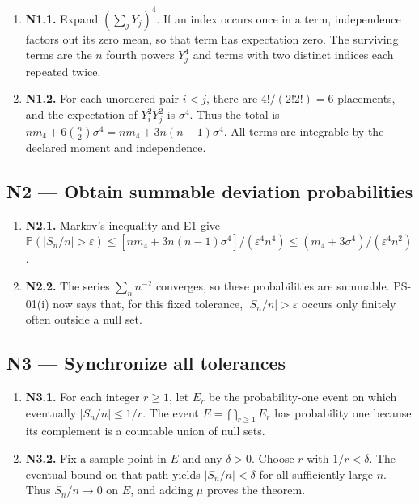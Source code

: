 \documentclass[preprint,12pt,aps,pra,showkeys,amsmath,amssymb,superscriptaddress,floatfix]{revtex4-2}
\theoremstyle{definition}
\theoremstyle{remark}
\begin{document}
\begin{enumerate}
\def\labelenumi{\arabic{enumi}.}
\item
  \textbf{N1.1.} Expand \((\sum_jY_j)^4\). If an index occurs once in a
  term, independence factors out its zero mean, so that term has
  expectation zero. The surviving terms are the \(n\) fourth powers
  \(Y_j^4\) and terms with two distinct indices each repeated twice.
\item
  \textbf{N1.2.} For each unordered pair \(i<j\), there are
  \(4!/(2!2!)=6\) placements, and the expectation of \(Y_i^2Y_j^2\) is
  \(\sigma^4\). Thus the total is
  \(n m_4+6\binom n2\sigma^4=n m_4+3n(n-1)\sigma^4\). All terms are
  integrable by the declared moment and independence.
\end{enumerate}

\subsection{N2 --- Obtain summable deviation
probabilities}\label{n2-obtain-summable-deviation-probabilities}

\begin{enumerate}
\def\labelenumi{\arabic{enumi}.}
\item
  \textbf{N2.1.} Markov's inequality and E1 give
  \(\mathbb P(|S_n/n|>\varepsilon)\le[n m_4+3n(n-1)\sigma^4]/(\varepsilon^4 n^4)\le(m_4+3\sigma^4)/(\varepsilon^4n^2)\).
\item
  \textbf{N2.2.} The series \(\sum_n n^{-2}\) converges, so these
  probabilities are summable. PS-01(i) now says that, for this fixed
  tolerance, \(|S_n/n|>\varepsilon\) occurs only finitely often outside
  a null set.
\end{enumerate}

\subsection{N3 --- Synchronize all
tolerances}\label{n3-synchronize-all-tolerances}

\begin{enumerate}
\def\labelenumi{\arabic{enumi}.}
\item
  \textbf{N3.1.} For each integer \(r\ge1\), let \(E_r\) be the
  probability-one event on which eventually \(|S_n/n|\le1/r\). The event
  \(E=\bigcap_{r\ge1}E_r\) has probability one because its complement is
  a countable union of null sets.
\item
  \textbf{N3.2.} Fix a sample point in \(E\) and any \(\delta>0\).
  Choose \(r\) with \(1/r<\delta\). The eventual bound on that path
  yields \(|S_n/n|<\delta\) for all sufficiently large \(n\). Thus
  \(S_n/n\to0\) on \(E\), and adding \(\mu\) proves the theorem.
\end{enumerate}
\end{document}
